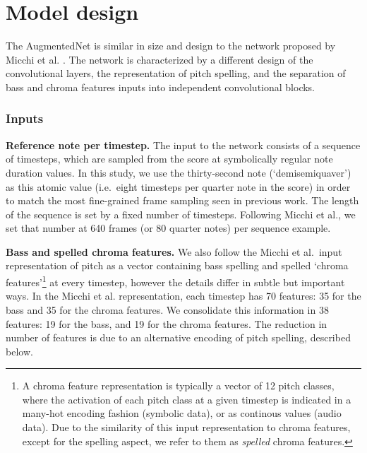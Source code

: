 \chapter{Model design}
\label{chap:model}


The AugmentedNet is similar in size and design to the network proposed by Micchi et al. \cite{micchi_not_2020}. The network is characterized by a different design of the convolutional layers, the representation of pitch spelling, and the separation of bass and chroma features inputs into independent convolutional blocks.

\subsection{Inputs}

\textbf{Reference note per timestep.}
The input to the network consists of a sequence of timesteps, which are sampled from the score at symbolically regular note duration values.
In this study, we use the thirty-second note (`demisemiquaver') as this atomic value (i.e.~eight timesteps per quarter note in the score) in order to match the most fine-grained frame sampling seen in previous work. The length of the sequence is set by a fixed number of timesteps. Following Micchi et al., we set that number at 640 frames (or 80 quarter notes) per sequence example.

\textbf{Bass and spelled chroma features.}
We also follow the Micchi et al.~input representation of pitch as a vector containing bass spelling and spelled `chroma features'\footnote{A chroma feature representation is typically a vector of 12 pitch classes, where the activation of each pitch class at a given timestep is indicated in a many-hot encoding fashion (symbolic data), or as continous values (audio data). 
Due to the similarity of this input representation to chroma features, except for the spelling aspect, we refer to them as \emph{spelled} chroma features.} at every timestep, however the details differ in subtle but important ways. 
In the Micchi et al. representation, each timestep has 70 features: 35 for the bass and 35 for the chroma features. 
We consolidate this information in 38 features: 19 for the bass, and 19 for the chroma features. The reduction in number of features is due to an alternative encoding of pitch spelling, described below.

